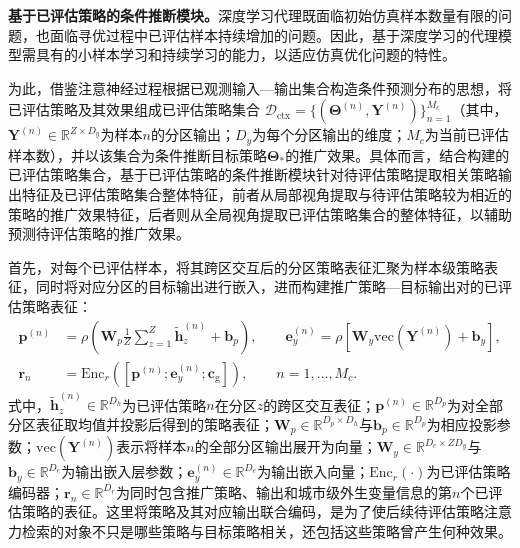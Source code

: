 \textbf{基于已评估策略的条件推断模块。}深度学习代理既面临初始仿真样本数量有限的问题，也面临寻优过程中已评估样本持续增加的问题。因此，基于深度学习的代理模型需具有的小样本学习和持续学习的能力，以适应仿真优化问题的特性。

为此，借鉴注意神经过程根据已观测输入—输出集合构造条件预测分布的思想\citep{kimAttentiveNeuralProcesses2019}，将已评估策略及其效果组成已评估策略集合
$\mathcal{D}_{\mathrm{ctx}}=\{(\bm{\Theta}^{(n)},\bm{Y}^{(n)})\}_{n=1}^{M_c}$（其中，$\bm{Y}^{(n)}\in\mathbb{R}^{Z\times D_y}$为样本$n$的分区输出；$D_y$为每个分区输出的维度；$M_c$为当前已评估样本数），并以该集合为条件推断目标策略$\bm{\Theta}_{*}$的推广效果。具体而言，结合构建的已评估策略集合，基于已评估策略的条件推断模块针对待评估策略提取相关策略输出特征及已评估策略集合整体特征，前者从局部视角提取与待评估策略较为相近的策略的推广效果特征，后者则从全局视角提取已评估策略集合的整体特征，以辅助预测待评估策略的推广效果。

首先，对每个已评估样本，将其跨区交互后的分区策略表征汇聚为样本级策略表征，同时将对应分区的目标输出进行嵌入，进而构建推广策略—目标输出对的已评估策略表征：
\begin{equation}
\begin{aligned}
\bm{p}^{(n)}
&=\rho\left(
\bm{W}_{p}\frac{1}{Z}\sum_{z=1}^{Z}\tilde{\bm{h}}_{z}^{(n)}
+\bm{b}_{p}
\right),\qquad
\bm{e}_{y}^{(n)}
=\rho\left[
\bm{W}_{y}\mathrm{vec}\left(\bm{Y}^{(n)}\right)+\bm{b}_{y}
\right],\\
\bm{r}_{n}
&=\mathrm{Enc}_{r}\left(
\left[\bm{p}^{(n)};\bm{e}_{y}^{(n)};\bm{c}_{\mathrm{g}}\right]
\right),
\qquad n=1,\ldots,M_c .
\end{aligned}
\label{eq.opt.contextencode}
\end{equation}
式中，$\widetilde{\bm{h}}_{z}^{(n)}\in\mathbb{R}^{D_h}$为已评估策略$n$在分区$z$的跨区交互表征；$\bm{p}^{(n)}\in\mathbb{R}^{D_p}$为对全部分区表征取均值并投影后得到的策略表征；$\bm{W}_{p}\in\mathbb{R}^{D_p\times D_h}$与$\bm{b}_{p}\in\mathbb{R}^{D_p}$为相应投影参数；$\mathrm{vec}(\bm{Y}^{(n)})$表示将样本$n$的全部分区输出展开为向量；$\bm{W}_{y}\in\mathbb{R}^{D_e\times ZD_y}$与$\bm{b}_{y}\in\mathbb{R}^{D_e}$为输出嵌入层参数；$\bm{e}_{y}^{(n)}\in\mathbb{R}^{D_e}$为输出嵌入向量；$\mathrm{Enc}_{r}(\cdot)$为已评估策略编码器；$\bm{r}_{n}\in\mathbb{R}^{D_r}$为同时包含推广策略、输出和城市级外生变量信息的第$n$个已评估策略的表征。这里将策略及其对应输出联合编码，是为了使后续待评估策略注意力检索的对象不只是哪些策略与目标策略相关，还包括这些策略曾产生何种效果。

